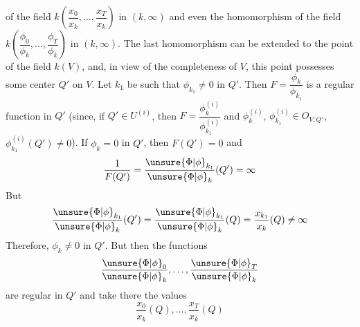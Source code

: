 of the field $k(\dfrac{x_0}{x_k},\ldots,\dfrac{x_T}{x_k})$ in $(k,\infty)$ and even the homomorphism of the field $k(\dfrac{\phi_0}{\phi_k},\ldots,\dfrac{\phi_T}{\phi_k})$ in $(k,\infty)$. The last homomorphism can be extended to the point of the field $k(V)$, and, in view of the completeness of $V$, this point possesses some center $Q'$ on $V$. Let $k_1$ be such that $\phi_{k_1}\ne0$ in $Q'$. Then $F=\dfrac{\phi_k}{\phi_{k_1}}$ is a regular function in $Q'$ (since, if $Q'\in U^{(i)}$, then $F=\dfrac{\phi_k^{(i)}}{\phi_{k_1}^{(i)}}$ and $\phi_k^{(i)}$, $\phi_{k_1}^{(i)}\in O_{V,Q'}$, $\phi_{k_1}^{(i)}(Q')\ne0$). If $\phi_k=0$ in $Q'$, then $F(Q')=0$ and
\[
\frac{1}{F(Q')}=\frac{\unsure{\Phi|\phi}_{k_1}}{\unsure{\Phi|\phi}_k}(Q')=\infty
\]
But
\[
\frac{\unsure{\Phi|\phi}_{k_1}}{\unsure{\Phi|\phi}_k}(Q')=\frac{\unsure{\Phi|\phi}_{k_1}}{\unsure{\Phi|\phi}_k}(Q)=\frac{x_{k_1}}{x_k}(Q)\ne\infty
\]
Therefore, $\phi_k\ne0$ in $Q'$. But then the functions
\[
\frac{\unsure{\Phi|\phi}_0}{\unsure{\Phi|\phi}_k},\ldots,\frac{\unsure{\Phi|\phi}_T}{\unsure{\Phi|\phi}_k}
\]
are regular in $Q'$ and take there the values
\[
\frac{x_0}{x_k}(Q),\ldots,\frac{x_T}{x_k}(Q)
\]
